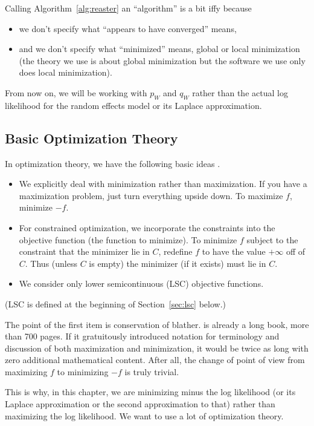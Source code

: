 Calling Algorithm~\ref{alg:reaster} an ``algorithm'' is a bit iffy because
\begin{itemize}
\item we don't specify what ``appears to have converged'' means,
\item and we don't specify what ``minimized'' means,
    global or local minimization (the theory we use is about global
    minimization but the software we use only does local minimization).
\end{itemize}

From now on, we will be working with $p_W$ and $q_W$ rather than the
actual log likelihood for the random effects model or its Laplace
approximation.

\subsection{Basic Optimization Theory}
\label{sec:basic}

In optimization theory, we have the following basic ideas
\citep[Sections~1.A, 1.B, and~1.C]{rockafellar-wets}.
\begin{itemize}
\item We explicitly deal with minimization rather than maximization.  If
    you have a maximization problem, just turn everything upside down.
    To maximize $f$, minimize $- f$.
\item For constrained optimization, we incorporate the constraints into
    the objective function (the function to minimize).
    To minimize $f$ subject to the constraint
    that the minimizer lie in $C$, redefine $f$ to have the value $+\infty$
    off of $C$.  Thus (unless $C$ is empty) the minimizer (if it exists)
    must lie in $C$.
\item We consider only lower semicontinuous (LSC) objective functions.
\end{itemize}
(LSC is defined at the beginning of Section~\ref{sec:lsc} below.)

The point of the first item is conservation of blather.
\citet{rockafellar-wets} is already a long book, more than 700 pages.
If it gratuitously introduced notation for terminology and discussion
of both maximization and minimization, it would be twice as long with
zero additional mathematical content.  After all, the change of point of
view from maximizing $f$ to minimizing $- f$ is truly trivial.

This is why, in this chapter, we are minimizing minus the log likelihood
(or its Laplace approximation or the second approximation to that)
rather than maximizing the log likelihood.
We want to use a lot of optimization theory.

